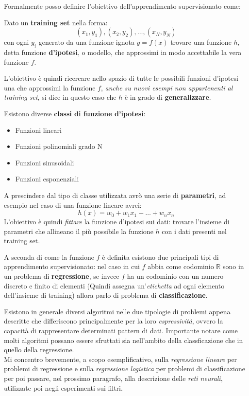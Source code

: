 \documentclass[../../main.tex]{subfiles}
\begin{document}
    Formalmente posso definire l'obiettivo dell'apprendimento supervisionato come:
    
    \begin{dfn}\label{def:supervised_learn}
        Dato un \textbf{training set} nella forma:
        \[(x_1, y_1), (x_2, y_2), \dots, (x_N, y_N)\]
        con ogni $y_i$ generato da una funzione ignota $y = f(x)$ trovare una funzione $h$, detta funzione \textbf{d'ipotesi}, o modello, che approssimi in modo accettabile la vera funzione $f$.
    \end{dfn}

    L'obiettivo è quindi ricercare nello spazio di tutte le possibili funzioni d'ipotesi una che approssimi la funzione $f$, \textit{anche su nuovi esempi non appartenenti al training set}, si dice in questo caso che $h$ è in grado di \textbf{generalizzare}.

    Esistono diverse \textbf{classi di funzione d'ipotesi}:
    \begin{itemize}
        \item Funzioni lineari
        \item Funzioni polinomiali grado N
        \item Funzioni sinusoidali
        \item Funzioni esponenziali
    \end{itemize}

    A prescindere dal tipo di classe utilizzata avrò una serie di \textbf{parametri}, ad esempio nel caso di una funzione lineare avrei:
    \[h(x) = w_0 + w_1x_1 + \dots + w_nx_n\]
    L'obiettivo è quindi \textit{fittare} la funzione d'ipotesi sui dati: trovare l'insieme di parametri che allineano il più possibile la funzione $h$ con i dati presenti nel training set. 

    A seconda di come la funzione $f$ è definita esistono due principali tipi di apprendimento supervisionato: nel caso in cui $f$ abbia come codominio $\mathbb{R}$ sono in un problema di \textbf{regressione}, se invece $f$ ha un codominio con un numero discreto e finito di elementi (Quindi assegna un'\textit{etichetta} ad ogni elemento dell'insieme di training) allora parlo di problema di \textbf{classificazione}.

    Esistono in generale diversi algoritmi nelle due tipologie di problemi appena descritte che differiscono principalmente per la loro \textit{espressività}, ovvero la capacità di rappresentare determinati pattern di dati. Importante notare come molti algoritmi possano essere sfruttati sia nell'ambito della classficazione che in quello della regressione.\\
    Mi concentro brevemente, a scopo esemplificativo, sulla \textit{regressione lineare} per problemi di regressione e sulla \textit{regressione logistica} per problemi di classificazione per poi passare, nel prossimo paragrafo, alla descrizione delle \textit{reti neurali}, utilizzate poi negli esperimenti sui filtri.
\end{document}
